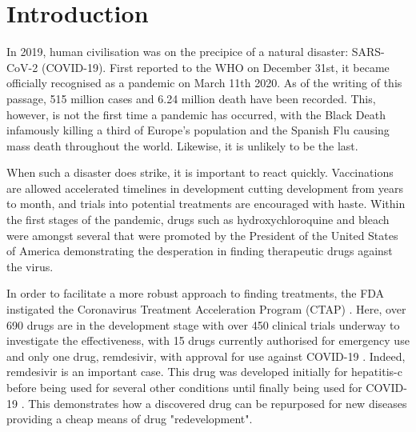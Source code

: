 
\chapter{Introduction}  %

\ifpdf
    \graphicspath{{Chapter1/Figs/Raster/}{Chapter1/Figs/PDF/}{Chapter1/Figs/}}
\else
    \graphicspath{{Chapter1/Figs/Vector/}{Chapter1/Figs/}}
\fi

In 2019, human civilisation was on the precipice of a natural disaster: \mbox{SARS-CoV-2} (\mbox{COVID-19}). First reported to the WHO on December 31st, it became officially recognised as a pandemic on March 11th 2020. As of the writing of this passage, 515 million cases and 6.24 million death have been recorded. This, however, is not the first time a pandemic has occurred, with the Black Death infamously killing a third of Europe's population and the Spanish Flu causing mass death throughout the world. Likewise, it is unlikely to be the last.

When such a disaster does strike, it is important to react quickly. Vaccinations are allowed accelerated timelines in development cutting development from years to month, and trials into potential treatments are encouraged with haste. Within the first stages of the pandemic, drugs such as hydroxychloroquine and bleach were amongst several that were promoted by the President of the United States of America demonstrating the desperation in finding therapeutic drugs against the virus.

In order to facilitate a more robust approach to finding treatments, the FDA instigated the Coronavirus Treatment Acceleration Program (CTAP) \cite{CTAP22}. Here, over 690 drugs are in the development stage with over 450 clinical trials underway to investigate the effectiveness, with 15 drugs currently authorised for emergency use and only one drug, remdesivir, with approval for use against \mbox{COVID-19} \cite{CTAP22}. Indeed, remdesivir is an important case. This drug was developed initially for hepatitis-c before being used for several other conditions until finally being used for \mbox{COVID-19} \cite{Joe20}. This demonstrates how a discovered drug can be repurposed for new diseases providing a cheap means of drug "redevelopment".

